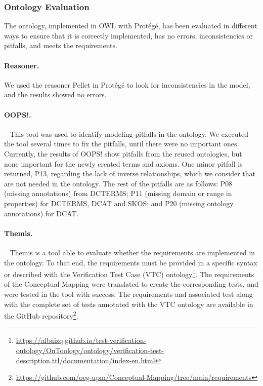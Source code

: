 \subsubsection{Ontology Evaluation}
\label{sec:chp4_cm-eval}


The ontology, implemented in OWL with Protégé, has been evaluated in different ways to ensure that it is correctly implemented, has no errors, inconsistencies or pitfalls, and meets the requirements.

\noindent\paragraph{\textbf{Reasoner.}} We used the reasoner Pellet in Protégé to look for inconsistencies in the model, and the results showed no errors.

\noindent\paragraph{\textbf{OOPS!.}}~\parencite{poveda2014oops} This tool was used to identify modeling pitfalls in the ontology. We executed the tool several times to fix the pitfalls, until there were no important ones. Currently, the results of OOPS! show pitfalls from the reused ontologies, but none important for the newly created terms and axioms. One minor pitfall is returned, P13, regarding the lack of inverse relationships, which we consider that are not  needed in the ontology. The rest of the pitfalls are as follows: P08 (missing annotations) from DCTERMS; P11 (missing domain or range in properties) for DCTERMS, DCAT and SKOS; and P20 (missing ontology annotations) for DCAT.

\noindent\paragraph{\textbf{Themis.}}~\parencite{fernandez2021themis} Themis is a tool able to evaluate whether the requirements are implemented in the ontology. To that end, the requirements must be provided in a specific syntax or described with the Verification Test Case (VTC) ontology\footnote{\url{https://albaizq.github.io/test-verification-ontology/OnToology/ontology/verification-test-description.ttl/documentation/index-en.html}}. The requirements of the Conceptual Mapping were translated to create the corresponding tests, and were tested in the tool with success. The requirements and associated test along with the complete set of tests annotated with the VTC ontology are available in the GitHub repository\footnote{\url{https://github.com/oeg-upm/Conceptual-Mapping/tree/main/requirements}}.

